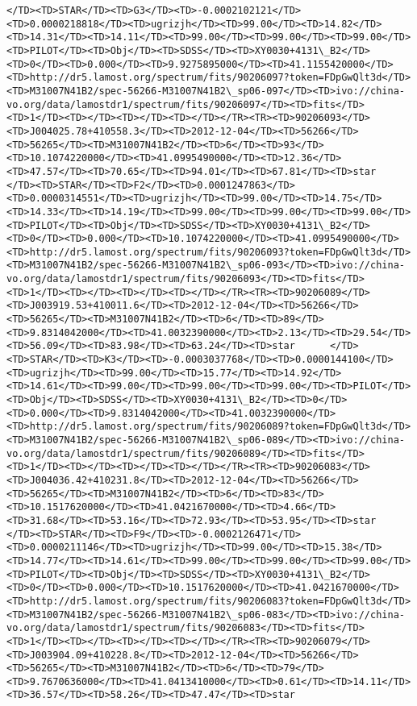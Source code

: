 \documentclass[11pt]{article}
\begin{document}
\begin{Verbatim}[commandchars=\\\{\}]
</TD><TD>STAR</TD><TD>G3</TD><TD>-0.0002102121</TD><TD>0.0000218818</TD><TD>ugrizjh</TD><TD>99.00</TD><TD>14.82</TD><TD>14.31</TD><TD>14.11</TD><TD>99.00</TD><TD>99.00</TD><TD>99.00</TD><TD>PILOT</TD><TD>Obj</TD><TD>SDSS</TD><TD>XY0030+4131\_B2</TD><TD>0</TD><TD>0.000</TD><TD>9.9275895000</TD><TD>41.1155420000</TD><TD>http://dr5.lamost.org/spectrum/fits/90206097?token=FDpGwQlt3d</TD><TD>M31007N41B2/spec-56266-M31007N41B2\_sp06-097</TD><TD>ivo://china-vo.org/data/lamostdr1/spectrum/fits/90206097</TD><TD>fits</TD><TD>1</TD><TD></TD><TD></TD><TD></TD></TR><TR><TD>90206093</TD><TD>J004025.78+410558.3</TD><TD>2012-12-04</TD><TD>56266</TD><TD>56265</TD><TD>M31007N41B2</TD><TD>6</TD><TD>93</TD><TD>10.1074220000</TD><TD>41.0995490000</TD><TD>12.36</TD><TD>47.57</TD><TD>70.65</TD><TD>94.01</TD><TD>67.81</TD><TD>star      </TD><TD>STAR</TD><TD>F2</TD><TD>0.0001247863</TD><TD>0.0000314551</TD><TD>ugrizjh</TD><TD>99.00</TD><TD>14.75</TD><TD>14.33</TD><TD>14.19</TD><TD>99.00</TD><TD>99.00</TD><TD>99.00</TD><TD>PILOT</TD><TD>Obj</TD><TD>SDSS</TD><TD>XY0030+4131\_B2</TD><TD>0</TD><TD>0.000</TD><TD>10.1074220000</TD><TD>41.0995490000</TD><TD>http://dr5.lamost.org/spectrum/fits/90206093?token=FDpGwQlt3d</TD><TD>M31007N41B2/spec-56266-M31007N41B2\_sp06-093</TD><TD>ivo://china-vo.org/data/lamostdr1/spectrum/fits/90206093</TD><TD>fits</TD><TD>1</TD><TD></TD><TD></TD><TD></TD></TR><TR><TD>90206089</TD><TD>J003919.53+410011.6</TD><TD>2012-12-04</TD><TD>56266</TD><TD>56265</TD><TD>M31007N41B2</TD><TD>6</TD><TD>89</TD><TD>9.8314042000</TD><TD>41.0032390000</TD><TD>2.13</TD><TD>29.54</TD><TD>56.09</TD><TD>83.98</TD><TD>63.24</TD><TD>star      </TD><TD>STAR</TD><TD>K3</TD><TD>-0.0003037768</TD><TD>0.0000144100</TD><TD>ugrizjh</TD><TD>99.00</TD><TD>15.77</TD><TD>14.92</TD><TD>14.61</TD><TD>99.00</TD><TD>99.00</TD><TD>99.00</TD><TD>PILOT</TD><TD>Obj</TD><TD>SDSS</TD><TD>XY0030+4131\_B2</TD><TD>0</TD><TD>0.000</TD><TD>9.8314042000</TD><TD>41.0032390000</TD><TD>http://dr5.lamost.org/spectrum/fits/90206089?token=FDpGwQlt3d</TD><TD>M31007N41B2/spec-56266-M31007N41B2\_sp06-089</TD><TD>ivo://china-vo.org/data/lamostdr1/spectrum/fits/90206089</TD><TD>fits</TD><TD>1</TD><TD></TD><TD></TD><TD></TD></TR><TR><TD>90206083</TD><TD>J004036.42+410231.8</TD><TD>2012-12-04</TD><TD>56266</TD><TD>56265</TD><TD>M31007N41B2</TD><TD>6</TD><TD>83</TD><TD>10.1517620000</TD><TD>41.0421670000</TD><TD>4.66</TD><TD>31.68</TD><TD>53.16</TD><TD>72.93</TD><TD>53.95</TD><TD>star      </TD><TD>STAR</TD><TD>F9</TD><TD>-0.0002126471</TD><TD>0.0000211146</TD><TD>ugrizjh</TD><TD>99.00</TD><TD>15.38</TD><TD>14.77</TD><TD>14.61</TD><TD>99.00</TD><TD>99.00</TD><TD>99.00</TD><TD>PILOT</TD><TD>Obj</TD><TD>SDSS</TD><TD>XY0030+4131\_B2</TD><TD>0</TD><TD>0.000</TD><TD>10.1517620000</TD><TD>41.0421670000</TD><TD>http://dr5.lamost.org/spectrum/fits/90206083?token=FDpGwQlt3d</TD><TD>M31007N41B2/spec-56266-M31007N41B2\_sp06-083</TD><TD>ivo://china-vo.org/data/lamostdr1/spectrum/fits/90206083</TD><TD>fits</TD><TD>1</TD><TD></TD><TD></TD><TD></TD></TR><TR><TD>90206079</TD><TD>J003904.09+410228.8</TD><TD>2012-12-04</TD><TD>56266</TD><TD>56265</TD><TD>M31007N41B2</TD><TD>6</TD><TD>79</TD><TD>9.7670636000</TD><TD>41.0413410000</TD><TD>0.61</TD><TD>14.11</TD><TD>36.57</TD><TD>58.26</TD><TD>47.47</TD><TD>star      
\end{Verbatim}
\end{document}
